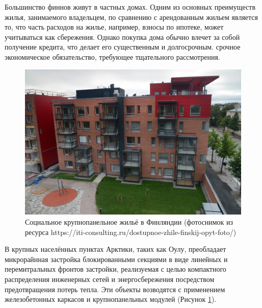 Большинство финнов живут в частных домах. Одним из основных преимуществ жилья, занимаемого владельцем, по сравнению с арендованным жильем является то,
что часть расходов на жилье, например, взносы по ипотеке, может учитываться как сбережения. Однако покупка дома обычно влечет за собой получение кредита,
что делает его существенным и долгосрочным. срочное экономическое обязательство, требующее тщательного рассмотрения.
\begin{figure}
    \centering
    \includegraphics[width=\textwidth]{assets/figures/st1ch03_finexp_001.png}
    \caption{Социальное крупнопанельное жильё в Финляндии (фотоснимок из ресурса https://iti-consulting.ru/dostupnoe-zhile-finskij-opyt-foto/)}
    \label{fig:st1ch03_finexp_001}
  \end{figure}


В крупных населённых пунктах Арктики, таких как Оулу, преобладает микрорайнная застройка блокированными секциями в виде линейных и перемитральных фронтов застройки,
реализуемая с целью компактного распределения инженерных сетей и энергосбережения посредством предотвращения потерь тепла.
Эти объекты возводятся с применением железобетонных каркасов и крупнопанельных модулей (Рисунок \ref{fig:st1ch03_finexp_001}).

